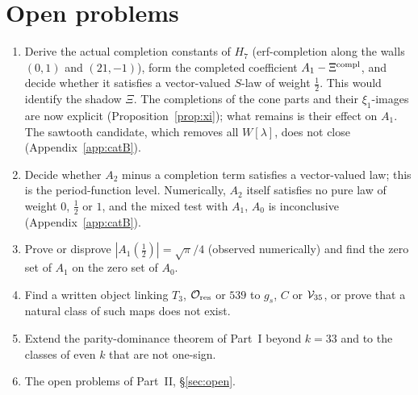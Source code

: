 \section{Open problems}\label{sec:gopen}
\begin{enumerate}[label=\arabic*.,leftmargin=2em]
\item\label{op:xi} Derive the actual completion constants of $H_7$ (erf-completion along the walls $(0,1)$ and $(21,-1)$), form the completed coefficient $A_1-\Xi^{\rm compl}$, and
decide whether it satisfies a vector-valued $S$-law of weight $\frac12$. This would identify the shadow $\Xi$. The completions of the cone parts and their $\xi_1$-images are now explicit (Proposition~\ref{prop:xi}); what remains is their effect on $A_1$. The sawtooth candidate, which removes all $W[\lambda]$, does not close (Appendix~\ref{app:catB}).
\item Decide whether $A_2$ minus a completion term satisfies a vector-valued law; this is the period-function level. Numerically, $A_2$ itself satisfies no pure law of weight $0$, $\frac12$ or $1$, and the mixed test with $A_1$, $A_0$ is inconclusive (Appendix~\ref{app:catB}).
\item Prove or disprove $|A_1(\frac12)|=\sqrt\pi/4$ (observed numerically) and find the zero set of $A_1$ on the zero set of $A_0$.
\item Find a written object linking $T_3$, $\mathcal O_{\rm res}$ or $539$ to $g_s$, $C$ or $\mathcal V_{35}$, or prove that a natural class of such maps does not exist.
\item Extend the parity-dominance theorem of Part~I beyond $k=33$ and to the classes of even $k$ that are not one-sign.
\item The open problems of Part~II, \S\ref{sec:open}.
\end{enumerate}
